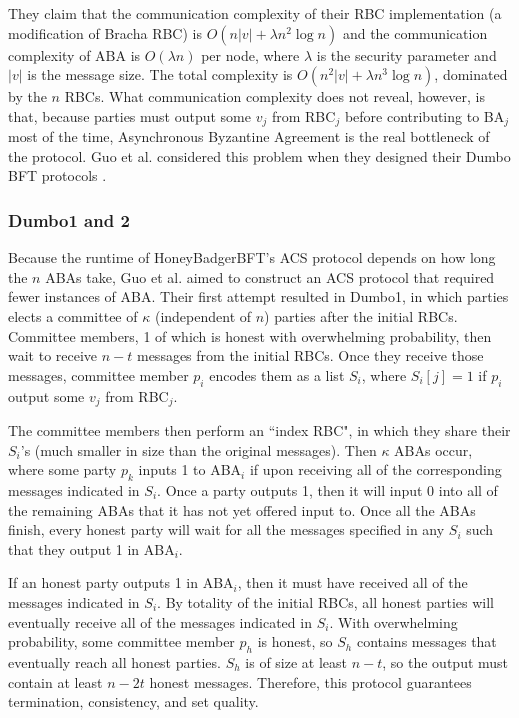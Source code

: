 \documentclass{article}
\begin{document}
They claim that the communication complexity of their RBC implementation (a modification of Bracha RBC) is $O(n|v| + \lambda n^2\log n)$ and the communication complexity of ABA is $O(\lambda n)$ per node, where $\lambda$ is the security parameter and $|v|$ is the message size. The total complexity is $O(n^2|v| + \lambda n^3\log n)$, dominated by the $n$ RBCs. What communication complexity does not reveal, however, is that, because parties must output some $v_j$ from RBC$_j$ before contributing to BA$_j$ most of the time, Asynchronous Byzantine Agreement is the real bottleneck of the protocol. Guo et al. considered this problem when they designed their Dumbo BFT protocols \cite{guo2020dumbo}.
\subsubsection{Dumbo1 and 2}
Because the runtime of HoneyBadgerBFT's ACS protocol depends on how long the $n$ ABAs take, Guo et al. aimed to construct an ACS protocol that required fewer instances of ABA. Their first attempt resulted in Dumbo1, in which parties elects a committee of $\kappa$ (independent of $n$) parties after the initial RBCs. Committee members, 1 of which is honest with overwhelming probability, then wait to receive $n - t$ messages from the initial RBCs. Once they receive those messages, committee member $p_i$ encodes them as a list $S_i$, where $S_i[j] = 1$ if $p_i$ output some $v_j$ from RBC$_j$.

The committee members then perform an ``index RBC", in which they share their $S_i$'s (much smaller in size than the original messages). Then $\kappa$ ABAs occur, where some party $p_k$ inputs 1 to ABA$_i$ if upon receiving all of the corresponding messages indicated in $S_i$. Once a party outputs 1, then it will input 0 into all of the remaining ABAs that it has not yet offered input to. Once all the ABAs finish, every honest party will wait for all the messages specified in any $S_i$ such that they output 1 in ABA$_i$.

If an honest party outputs 1 in ABA$_i$, then it must have received all of the messages indicated in $S_i$. By totality of the initial RBCs, all honest parties will eventually receive all of the messages indicated in $S_i$. With overwhelming probability, some committee member $p_h$ is honest, so $S_h$ contains messages that eventually reach all honest parties. $S_h$ is of size at least $n - t$, so the output must contain at least $n - 2t$ honest messages. Therefore, this protocol guarantees termination, consistency, and set quality.
\end{document}
